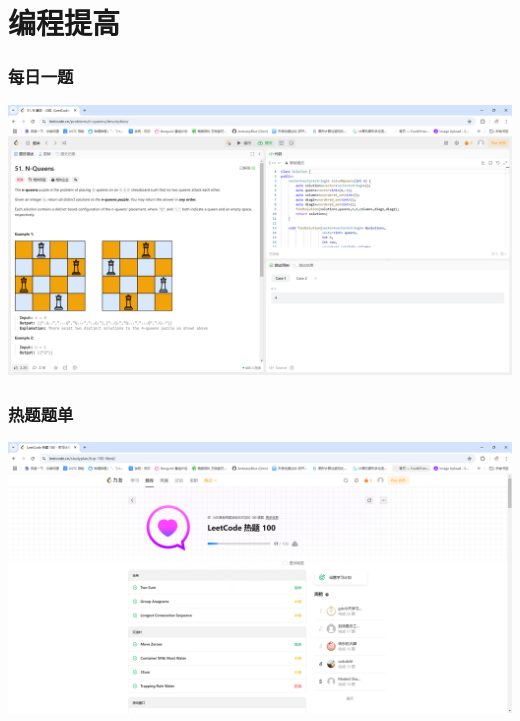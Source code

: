 \documentclass{beamer}
\begin{document}
\section{编程提高}
\begin{frame}
    \frametitle{每日一题}
    \includegraphics[width=\textwidth]{pic2.png}
\end{frame}

\begin{frame}
    \frametitle{热题题单}
    \includegraphics[width=\textwidth]{pic3.png}
\end{frame}
\end{document}
